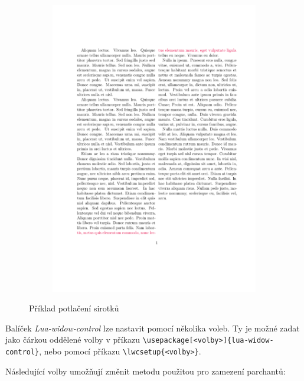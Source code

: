 \documentclass{csbulletin}
\newcommand\balicek[1]{\textit{#1}}
\begin{document}
\begin{figure}[htbp]
\begin{subfigure}[t]{0.48\textwidth}
\begin{center}
    \includegraphics[width=\textwidth,page=2]{examples/widow.pdf}
  \end{center}
\end{subfigure}
\caption{Příklad potlačení sirotků}
\label{fig:sirotek}
\end{figure}


Balíček \balicek{Lua-widow-control} lze nastavit pomocí několika voleb. Ty je možné zadat jako čárkou oddělené volby 
v příkazu  \verb|\usepackage[<volby>]{lua-widow-control}|, nebo pomocí příkazu 
\verb|\lwcsetup{<volby>}|.

Následující volby umožňují změnit metodu použitou pro zamezení parchantů:
\end{document}
